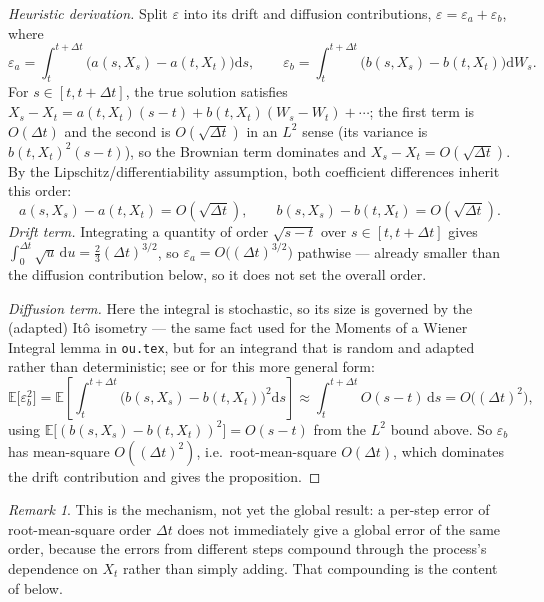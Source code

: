 \documentclass[11pt]{article}
\newcommand{\E}{\mathbb{E}}
\newcommand{\dd}{\mathrm{d}}
\newcommand{\drift}{a}
\newcommand{\diff}{b}
\theoremstyle{plain}
\theoremstyle{definition}
\theoremstyle{remark}
\newtheorem{remark}{Remark}
\begin{document}
\begin{proof}[Heuristic derivation]
Split $\varepsilon$ into its drift and diffusion contributions,
$\varepsilon = \varepsilon_{\drift} + \varepsilon_{\diff}$, where
\[
   \varepsilon_{\drift} = \int_t^{t+\Delta t}\!\big(\drift(s,X_s)-\drift(t,X_t)\big)\dd s,
   \qquad
   \varepsilon_{\diff} = \int_t^{t+\Delta t}\!\big(\diff(s,X_s)-\diff(t,X_t)\big)\dd W_s.
\]
For $s\in[t,t+\Delta t]$, the true solution satisfies
$X_s - X_t = \drift(t,X_t)(s-t) + \diff(t,X_t)(W_s-W_t) + \cdots$; the
first term is $O(\Delta t)$ and the second is $O(\sqrt{\Delta t})$ in
an $L^2$ sense (its variance is $\diff(t,X_t)^2(s-t)$), so the
Brownian term dominates and $X_s-X_t = O(\sqrt{\Delta t})$. By the
Lipschitz/differentiability assumption, both coefficient differences
inherit this order:
\[
   \drift(s,X_s)-\drift(t,X_t) = O(\sqrt{\Delta t}), \qquad
   \diff(s,X_s)-\diff(t,X_t)   = O(\sqrt{\Delta t}).
\]
\emph{Drift term.} Integrating a quantity of order $\sqrt{s-t}$ over
$s\in[t,t+\Delta t]$ gives $\int_0^{\Delta t}\sqrt{u}\,\dd u =
\tfrac23(\Delta t)^{3/2}$, so $\varepsilon_{\drift}=O\big((\Delta
t)^{3/2}\big)$ pathwise --- already smaller than the diffusion
contribution below, so it does not set the overall order.

\emph{Diffusion term.} Here the integral is stochastic, so its size is
governed by the (adapted) It\^o isometry --- the same fact used for
the Moments of a Wiener Integral lemma in \texttt{ou.tex}, but for an
integrand that is random and adapted rather than deterministic; see
 or  for this more
general form:
\[
   \E\big[\varepsilon_{\diff}^2\big]
     = \E\left[\int_t^{t+\Delta t}\!\big(\diff(s,X_s)-\diff(t,X_t)\big)^2\dd s\right]
     \approx \int_t^{t+\Delta t} O(s-t)\,\dd s = O\big((\Delta t)^2\big),
\]
using $\E\big[(\diff(s,X_s)-\diff(t,X_t))^2\big]=O(s-t)$ from the
$L^2$ bound above. So $\varepsilon_{\diff}$ has mean-square
$O((\Delta t)^2)$, i.e.\ root-mean-square $O(\Delta t)$, which
dominates the drift contribution and gives the proposition.
\end{proof}

\begin{remark}
This is the mechanism, not yet the global result: a per-step error
of root-mean-square order $\Delta t$ does not immediately give a
global error of the same order, because the errors from different
steps compound through the process's dependence on $X_t$ rather than
simply adding. That compounding is the content of
 below.
\end{remark}
\end{document}
